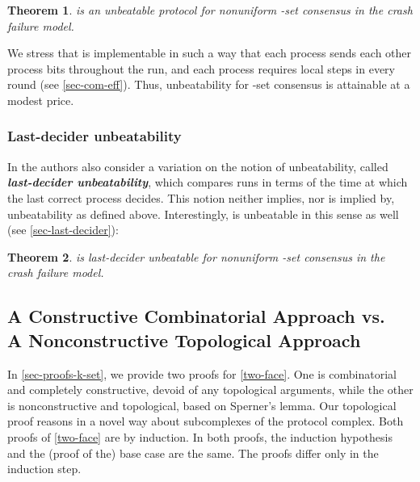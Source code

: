 \documentclass[11pt]{article}
\newtheorem{theorem}{Theorem}
\theoremstyle{definition}
\newcommand{\defemph}[1]{\textbf{\textit{#1}}}
\begin{document}
\begin{theorem}
\label{thm:OptMink}
 is an unbeatable protocol for non\-uniform -set consensus in the crash failure model.
\end{theorem}

We stress that  is implementable in such a way that each process sends
each other process  bits throughout the run, and each process requires  local steps in every round (see \cref{sec-com-eff}).
Thus, unbeatability for -set consensus is attainable at a modest price.

\subsubsection{Last-decider unbeatability}
In \cite{AYY-DISC} the authors also consider  a variation on the notion of unbeatability, called \defemph{last-decider unbeatability}, which compares runs in terms of the time at which the last correct process decides.
This notion neither implies, nor is implied by, unbeatability as defined above.
Interestingly,  is unbeatable in this sense as well (see \cref{sec-last-decider}):

\begin{theorem}
\label{thm:last-decider}
 is last-decider unbeatable for non\-uniform -set consensus in the crash failure model.
\end{theorem}

\subsection{A Constructive Combinatorial Approach vs.\texorpdfstring{\\}{ }A Nonconstructive Topological Approach}
\label{two-approaches}

In \cref{sec-proofs-k-set}, we provide
two proofs for \cref{two-face}. One is combinatorial and completely constructive,
devoid of any topological arguments, while the other
 is nonconstructive and topological, based on Sperner's lemma.
Our topological proof  reasons in a novel way about subcomplexes of the protocol complex.
Both proofs of
\cref{two-face} are by induction.
In both proofs, the induction hypothesis and the (proof of the) base case are the same.
The proofs differ only in
the induction step.
\end{document}
